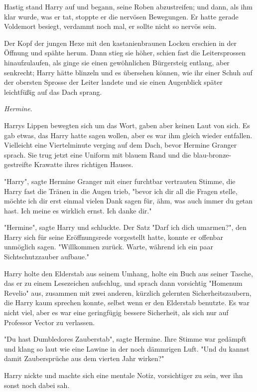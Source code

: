 {Hastig stand Harry auf und begann, seine Roben abzustreifen; und dann, als ihm klar wurde, was er tat, stoppte er die nervösen Bewegungen. Er hatte gerade Voldemort besiegt, verdammt noch mal, er sollte nicht so nervös sein.

Der Kopf der jungen Hexe mit den kastanienbraunen Locken erschien in der Öffnung und spähte herum. Dann stieg sie höher, schien fast die Leitersprossen hinaufzulaufen, als ginge sie einen gewöhnlichen Bürgersteig entlang, aber senkrecht; Harry hätte blinzeln und es übersehen können, wie ihr einer Schuh auf der obersten Sprosse der Leiter landete und sie einen Augenblick später leichtfüßig auf das Dach sprang.

\emph{Hermine}.

Harrys Lippen bewegten sich um das Wort, gaben aber keinen Laut von sich. Es gab etwas, das Harry hatte sagen wollen, aber es war ihm gleich wieder entfallen. Vielleicht eine Viertelminute verging auf dem Dach, bevor Hermine Granger sprach. Sie trug jetzt eine Uniform mit blauem Rand und die blau-bronze-gestreifte Krawatte ihres richtigen Hauses.

"Harry", sagte Hermine Granger mit einer furchtbar vertrauten Stimme, die Harry fast die Tränen in die Augen trieb, "bevor ich dir all die Fragen stelle, möchte ich dir erst einmal vielen Dank sagen für, ähm, was auch immer du getan hast. Ich meine es wirklich ernst. Ich danke dir."

"Hermine", sagte Harry und schluckte. Der Satz "Darf ich dich umarmen?", den Harry sich für seine Eröffnungsrede vorgestellt hatte, konnte er offenbar unmöglich sagen. "Willkommen zurück. Warte, während ich ein paar Sichtschutzzauber aufbaue."

Harry holte den Elderstab aus seinem Umhang, holte ein Buch aus seiner Tasche, das er zu einem Lesezeichen aufschlug, und sprach dann vorsichtig "Homenum Revelio" aus, zusammen mit zwei anderen, kürzlich gelernten Sicherheitszaubern, die Harry kaum sprechen konnte, selbst wenn er den Elderstab benutzte. Es war nicht viel, aber es war eine geringfügig bessere Sicherheit, als sich nur auf Professor Vector zu verlassen.

"Du hast Dumbledores Zauberstab", sagte Hermine. Ihre Stimme war gedämpft und klang so laut wie eine Lawine in der noch dämmrigen Luft. "Und du kannst damit Zaubersprüche aus dem vierten Jahr wirken?"

Harry nickte und machte sich eine mentale Notiz, vorsichtiger zu sein, wer ihn sonst noch dabei sah.

}
